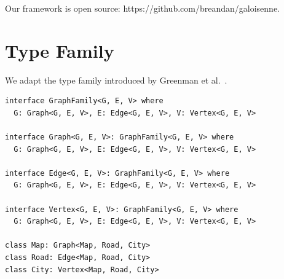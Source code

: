 \documentclass[sigplan,10pt,review,anonymous]{acmart}
\begin{document}






Our framework is open source: https://github.com/breandan/galoisenne.
\section{Type Family}

We adapt the type family introduced by Greenman et al.~\citep{greenman2014getting}.

\begin{lstlisting}
interface GraphFamily<G, E, V> where
  G: Graph<G, E, V>, E: Edge<G, E, V>, V: Vertex<G, E, V>

interface Graph<G, E, V>: GraphFamily<G, E, V> where
  G: Graph<G, E, V>, E: Edge<G, E, V>, V: Vertex<G, E, V>

interface Edge<G, E, V>: GraphFamily<G, E, V> where
  G: Graph<G, E, V>, E: Edge<G, E, V>, V: Vertex<G, E, V>

interface Vertex<G, E, V>: GraphFamily<G, E, V> where
  G: Graph<G, E, V>, E: Edge<G, E, V>, V: Vertex<G, E, V>

class Map: Graph<Map, Road, City>
class Road: Edge<Map, Road, City>
class City: Vertex<Map, Road, City>
\end{lstlisting}
\end{document}
